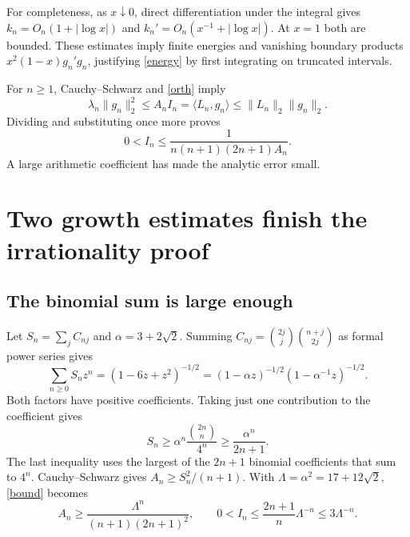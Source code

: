 \documentclass[11pt]{article}
\newcommand{\ip}[2]{\langle #1,#2\rangle}
\begin{document}
For completeness, as $x\downarrow0$, direct differentiation under the integral gives
$k_n=O_n(1+|\log x|)$ and $k_n'=O_n(x^{-1}+|\log x|)$. At $x=1$ both are bounded. These estimates imply finite energies and vanishing boundary products $x^2(1-x)g_n'g_n$, justifying \eqref{energy} by first integrating on truncated intervals.

For $n\ge1$, Cauchy--Schwarz and \eqref{orth} imply
\[
 \lambda_n\|g_n\|_2^2\le A_nI_n
   =\ip{L_n}{g_n}\le\|L_n\|_2\|g_n\|_2.
\]
Dividing and substituting once more proves
\begin{equation}\label{bound}
 \boxed{0<I_n\le\frac1{n(n+1)(2n+1)A_n}.}
\end{equation}
A large arithmetic coefficient has made the analytic error small.

\section{Two growth estimates finish the irrationality proof}
\subsection{The binomial sum is large enough}
Let $S_n=\sum_jC_{nj}$ and $\alpha=3+2\sqrt2$. Summing
$C_{nj}=\binom{2j}j\binom{n+j}{2j}$ as formal power series gives
\[
 \sum_{n\ge0}S_nz^n=(1-6z+z^2)^{-1/2}
 =(1-\alpha z)^{-1/2}(1-\alpha^{-1}z)^{-1/2}.
\]
Both factors have positive coefficients. Taking just one contribution to the coefficient gives
\[
 S_n\ge\alpha^n\frac{\binom{2n}n}{4^n}\ge\frac{\alpha^n}{2n+1}.
\]
The last inequality uses the largest of the $2n+1$ binomial coefficients that sum to $4^n$. Cauchy--Schwarz gives $A_n\ge S_n^2/(n+1)$. With $\Lambda=\alpha^2=17+12\sqrt2$, \eqref{bound} becomes
\begin{equation}\label{decay}
 A_n\ge\frac{\Lambda^n}{(n+1)(2n+1)^2},\qquad
 0<I_n\le\frac{2n+1}{n}\Lambda^{-n}\le3\Lambda^{-n}.
\end{equation}
\end{document}
